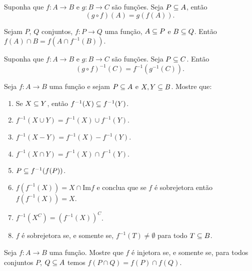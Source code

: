 \documentclass[12pt]{exam}
\begin{document}
    \vspace{.3cm}

    \questao{} Suponha que $f : A \to B$ e $g : B \to C$ são funções. Seja $P \subseteq A$, então
    \[
        (g \circ f)(A) = g(f(A)).
    \]

    \vspace{.3cm}

    \questao{} Sejam $P$, $Q$ conjuntos, $f : P \to Q$ uma função, $A \subseteq P$ e $B \subseteq Q$. Então $f(A) \cap B = f(A \cap f^{-1}(B))$.

    \vspace{.3cm}

    \questao{} Suponha que $f : A \to B$ e $g : B \to C$ são funções. Seja $P \subseteq C$. Então
    \[
        (g \circ f)^{-1}(C) = f^{-1}(g^{-1}(C)).
    \]

    \questao{} Seja $f : A \to B$ uma função e sejam $P \subseteq
    A$ e $X, Y\subseteq B$. Mostre que:
    \begin{enumerate}[label={\alph*})]
        \item Se $X\subseteq Y$, então $f^{-1}(X)\subseteq f^{-1}(Y)$.

        \item $f^{-1}(X\cup Y)=f^{-1}(X)\cup f^{-1}(Y)$.

        \item $f^{-1}(X - Y) = f^{-1}(X) - f^{-1}(Y)$.

        \item $f^{-1}(X\cap Y)= f^{-1}(X)\cap f^{-1}(Y)$.

        \item $P\subseteq f^{-1}(f(P))$.

        \item $f(f^{-1}(X))= X \cap \mbox{Im}f$ e conclua que se $f$ é sobrejetora então
        $f(f^{-1}(X))=X$.
        \item $f^{-1}(X^C) = (f^{-1}(X))^C$.

        \item $f$ é sobrejetora se, e somente se, $f^{-1}(T) \ne \emptyset$ para todo $T \subseteq B$.
    \end{enumerate}

    \vspace{.3cm}

    \questao{} Seja $f : A \to B$ uma função. Mostre que $f$ é injetora se, e somente se, para todos conjuntos $P$, $Q \subseteq A$ temos $f(P \cap Q) = f(P) \cap f(Q)$.

    \vspace{.3cm}
\end{document}
